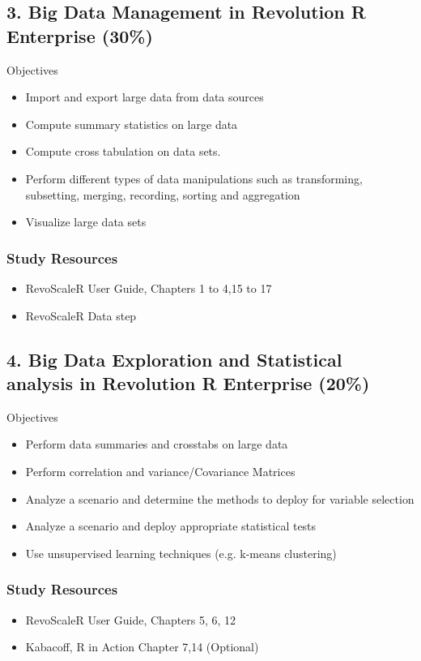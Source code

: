 \documentclass[]{article}
\begin{document}
\subsection*{3. Big Data Management in Revolution R Enterprise (30\%)}

Objectives
\begin{itemize}
	\item Import and export large data from data sources
	\item Compute summary statistics on large data
	\item Compute cross tabulation on data sets.
	\item Perform different types of data manipulations such as transforming, subsetting, merging, recording, sorting and aggregation
	\item Visualize large data sets
\end{itemize} 
\subsubsection*{Study Resources}
\begin{itemize}
	\item RevoScaleR User Guide, Chapters 1 to 4,15 to 17
	\item RevoScaleR Data step
\end{itemize}
\newpage

\subsection*{4. Big Data Exploration and Statistical analysis in Revolution R Enterprise (20\%)}
	Objectives
	\begin{itemize}
		\item Perform data summaries and crosstabs on large data
		\item Perform correlation and variance/Covariance Matrices
		\item Analyze a scenario and determine the methods to deploy for variable selection
		\item Analyze a scenario and deploy appropriate statistical tests
		\item Use unsupervised learning techniques (e.g. k-means clustering)
	\end{itemize}
\subsubsection*{Study Resources}
	\begin{itemize}
		\item RevoScaleR User Guide, Chapters 5, 6, 12
		\item Kabacoff, R in Action Chapter 7,14 (Optional)
	\end{itemize} 
	\newpage
	
\end{document}
